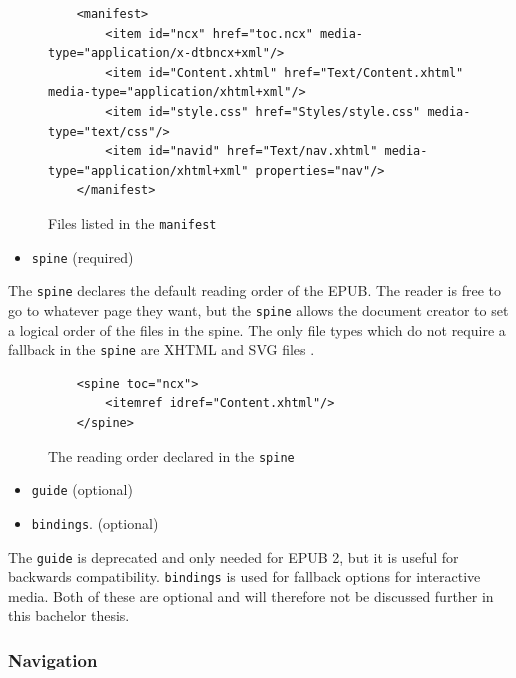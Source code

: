 \begin{figure}
	\begin{lstlisting}
	<manifest>
		<item id="ncx" href="toc.ncx" media-type="application/x-dtbncx+xml"/>
		<item id="Content.xhtml" href="Text/Content.xhtml" media-type="application/xhtml+xml"/>
		<item id="style.css" href="Styles/style.css" media-type="text/css"/>
		<item id="navid" href="Text/nav.xhtml" media-type="application/xhtml+xml" properties="nav"/>
	</manifest>
	\end{lstlisting}
	\caption{Files listed in the \lstinline{manifest}}
	\label{fig:manifest}
\end{figure}

\begin{itemize}
	\item \lstinline{spine} (required)
\end{itemize}

The \lstinline{spine} declares the default reading order of the EPUB. The reader is free to go to whatever page they want, but the \lstinline|spine| allows the document creator to set a logical order of the files in the spine. The only file types which do not require a fallback in the \lstinline|spine| are XHTML and SVG files \cite{EPUB3bp}.

\begin{figure}
	\begin{lstlisting}
	<spine toc="ncx">
		<itemref idref="Content.xhtml"/>
	</spine>
	\end{lstlisting}
	\caption{The reading order declared in the \lstinline{spine}}
	\label{fig:spine}
\end{figure}
\begin{itemize}
	\item \lstinline{guide} (optional)
\end{itemize}
\begin{itemize}
	\item \lstinline{bindings}. (optional)
\end{itemize}
The \lstinline|guide| is deprecated and only needed for EPUB 2, but it is useful for backwards compatibility. \lstinline|bindings| is used for fallback options for interactive media. Both of these are optional and will therefore not be discussed further in this bachelor thesis.

\subsubsection{Navigation}

